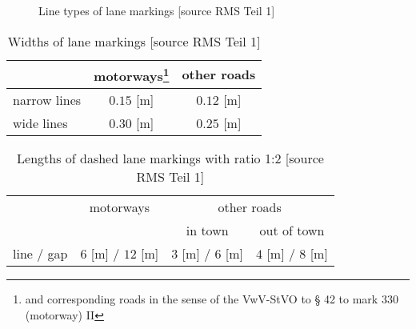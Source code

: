 \begin{figure}
\centering
{}
\quad
{}
\newline
{}
\quad
{}
\quad
{}
\caption{\small Line types of lane markings [source RMS Teil 1]}
\label{fig:LaneMarkingTypes}
\end{figure}
\setlength{\floatsep}{16pt plus 1.0pt minus 2.0pt}
\begin{table}
    \centering
    \begin{tabular}{l|cc}
    \toprule
           & motorways\footnote{and corresponding roads in the sense of the VwV-StVO to § 42 to mark 330 (motorway) II}  & other roads\\
    \midrule
    narrow lines & $0.15$ [m] & $0.12$ [m] \\
    wide lines   & $0.30$ [m] & $0.25$ [m] \\
    \bottomrule
    \end{tabular}
    \caption{\small Widths of lane markings [source RMS Teil 1]}
    \label{tab:LaneMarkingWidths}
\end{table}
\setlength{\floatsep}{16pt plus 1.0pt minus 2.0pt}
\begin{table}
    \centering
    \begin{tabular}{l|ccc}
    \toprule
          & motorways & \multicolumn{2}{c}{other roads}\\
          &           & in town & out of town\\
    \midrule
    line / gap  & $6$ [m] / $12$ [m] & $3$ [m] / $6$ [m] & $4$ [m] / $8$ [m]\\
    \bottomrule
    \end{tabular}
    \caption{\small Lengths of dashed lane markings with ratio 1:2 [source RMS Teil 1]}
    \label{tab:DashedLaneMarkingLengths}
\end{table}


